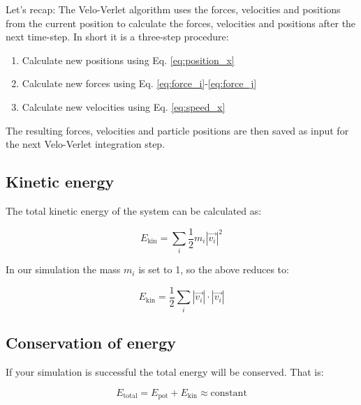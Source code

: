 \documentclass{article}
\begin{document}
Let's recap: The Velo-Verlet algorithm uses the forces, velocities and positions from the current position to calculate the forces, velocities and positions after the next time-step.
In short it is a three-step procedure:

\begin{enumerate}
    \item Calculate new positions using Eq. \ref{eq:position_x}
    \item Calculate new forces using Eq. \ref{eq:force_i}-\ref{eq:force_j}
    \item Calculate new velocities using Eq. \ref{eq:speed_x}
\end{enumerate}

The resulting forces, velocities and particle positions are then saved as input for the next Velo-Verlet integration step.

\subsection{Kinetic energy}

The total kinetic energy of the system can be calculated as:

\begin{equation}
    E_{\mathrm{kin}} = \sum_i \frac{1}{2} m_i |\vec{v_i}|^2
\end{equation}

In our simulation the mass $m_i$ is set to 1, so the above reduces to:

\begin{equation}
    E_{\mathrm{kin}} = \frac{1}{2} \sum_i |\vec{v_i}| \cdot |\vec{v_i}|
\end{equation}

% 
% 


\subsection{Conservation of energy}

If your simulation is successful the total energy will be conserved. That is:

\begin{equation}
    E_{\mathrm{total}} = E_{\mathrm{pot}} + E_{\mathrm{kin}} \approx \mathrm{constant}
\end{equation}
\end{document}
